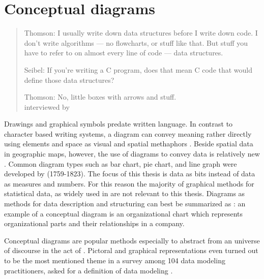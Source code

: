 \section{Conceptual diagrams}
\label{sec:diagrams}

\begin{quotation}%
Thomson: I usually write down data structures before I write down code. I don't write
algorithms --- no flowcharts, or stuff like that. But stuff you have to refer 
to on almost every line of code --- data structures.

\vspace*{1mm}

Seibel: If you're writing a C program, does that mean C code that would define those
data structures?

\vspace*{1mm}

Thomson: No, little boxes with arrows and stuff.
\\ \quotationsource {} interviewed by \textcite[p. 459]{Seibel2009}
\end{quotation}

\noindent Drawings and graphical symbols predate written language.  In contrast
to character based writing systems, a diagram can convey meaning rather
directly using elements and space as visual and spatial methaphors
\cite{Tversky2001,Winn1990}. Beside spatial data in geographic maps, however,
the use of diagrams to convey data is relatively new \cite{Tufte2001}.  Common
diagram types such as bar chart, pie chart, and line graph were developed by
 (1759-1823). The focus of this thesis is data as bits
instead of data as measures and numbers. For this reason the majority of
graphical methods for statistical data, as widely used in  \cite{Friendly2009} are not relevant to this thesis. Diagrams as
methods for data description and structuring can best be summarized as
: an example of a conceptual diagram is an
organizational chart which represents organizational parts and their
relationships in a company.

Conceptual diagrams are popular methods especially to abstract from an universe
of discourse in the act of .  Pictoral and graphical
representations even turned out to be the most mentioned theme in a survey
among 104 data modeling practitioners, asked for a definition of data modeling
\cite[p.  192]{Simsion2007}.

